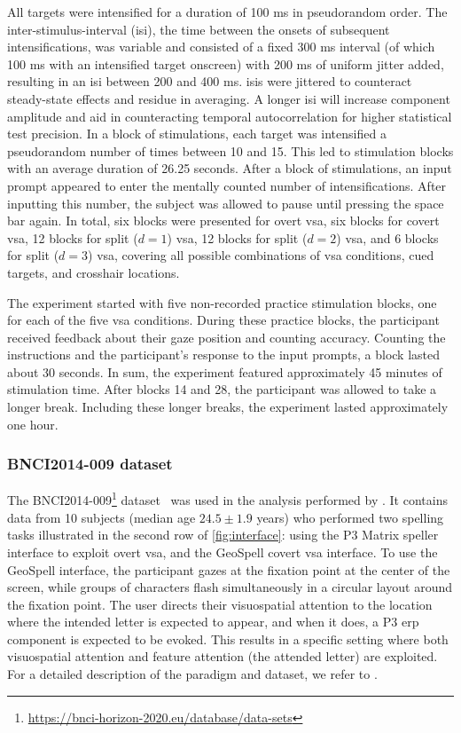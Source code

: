 All targets were intensified for a duration of 100 ms in pseudorandom order.
The inter-stimulus-interval (\ac{isi}), the time between the onsets of subsequent intensifications,
was variable and consisted of a fixed 300 ms interval (of which 100 ms with an intensified target onscreen)
with 200 ms of uniform jitter added, resulting in an \ac{isi}
between 200 and 400 ms.
\Acp{isi} were jittered to counteract steady-state effects and residue in averaging. A
longer \ac{isi} will increase component amplitude and aid in counteracting temporal
autocorrelation for higher statistical test precision.
In a block of stimulations, each target was intensified a pseudorandom number of times between 10 and 15.
This led to stimulation blocks with an average duration of 26.25 seconds. After a block of stimulations, an
input prompt appeared to enter the mentally counted number of intensifications.
After inputting this number, the subject was allowed to pause until pressing the space bar again.
In total, six blocks were presented for overt \ac{vsa}, six blocks for covert \ac{vsa}, 12 blocks for
split ($d=1$) \ac{vsa}, 12 blocks for split ($d=2$) \ac{vsa}, and 6 blocks for split
($d=3$) \ac{vsa}, covering all possible combinations of \ac{vsa} conditions, cued targets, and
crosshair locations.

The experiment started with five non-recorded practice stimulation blocks, one for
each of the five \ac{vsa} conditions.
During these practice blocks, the participant received feedback about their gaze
position and counting accuracy.
Counting the instructions and the participant's response to the
input prompts, a block lasted about 30 seconds. In sum, the experiment featured approximately 45 minutes of
stimulation time.
After blocks 14 and 28, the participant was allowed to take a longer break.
Including these longer breaks, the experiment lasted approximately one hour.

\subsubsection{BNCI2014-009 dataset}
The BNCI2014-009\footnote{\url{https://bnci-horizon-2020.eu/database/data-sets}}
dataset~\cite{Aloise2012a} was used in the analysis performed
by \textcite{Arico2014}.
It contains data from 10 subjects (median age $24.5\pm1.9$
years) who performed two spelling tasks illustrated in the second row of
\cref{fig:interface}: using the P3 Matrix speller
interface to exploit overt \ac{vsa}, and the GeoSpell covert \ac{vsa} interface.
To use the GeoSpell interface, the participant gazes at the fixation point at the
center of the screen, while groups of characters flash simultaneously in a
circular layout around the fixation point.
The user directs their visuospatial attention to the location where the intended letter is expected
to appear, and when it does, a P3 \ac{erp} component is expected to be evoked.
This results in a specific setting where both visuospatial attention and
feature attention (the attended letter) are exploited.
For a detailed description of the paradigm and dataset, we refer
to \textcite{Aloise2012a}.

